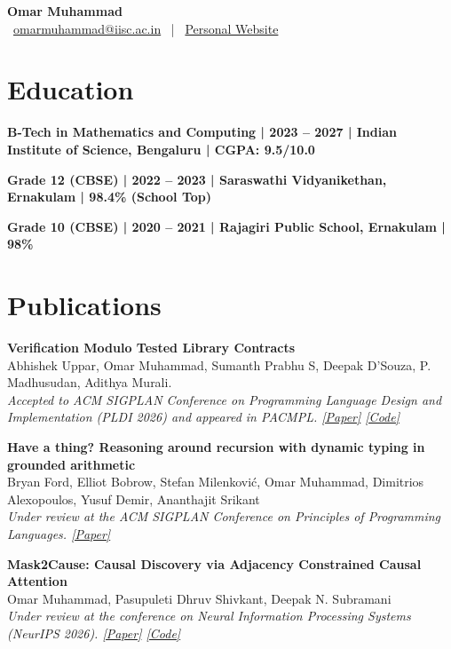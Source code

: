\documentclass[a4paper,10pt]{article}
\newcommand{\pub}[3]{
    \noindent \textbf{#1} \\
    #2 \\
    \textit{#3}
}
\begin{document}
\begin{center}
    {\Huge \textbf{\color{primary} Omar Muhammad}} \\ \vspace{4pt}
 \ \href{mailto:omarmuhammad@iisc.ac.in}{omarmuhammad@iisc.ac.in} \ | \ \href{https://omar826.github.io/}{Personal Website}
\end{center}


\section*{Education}
\noindent \textbf{B-Tech in Mathematics and Computing | 2023 -- 2027 | Indian Institute of Science, Bengaluru | CGPA: 9.5/10.0}

\vspace{3pt}
\noindent \textbf{Grade 12 (CBSE) | 2022 -- 2023 | Saraswathi Vidyanikethan, Ernakulam | 98.4\% (School Top)}

\vspace{3pt}
\noindent \textbf{Grade 10 (CBSE) | 2020 -- 2021 | Rajagiri Public School, Ernakulam | 98\%}

\section*{Publications}
\pub{Verification Modulo Tested Library Contracts}
{Abhishek Uppar, Omar Muhammad, Sumanth Prabhu S, Deepak D'Souza, P. Madhusudan, Adithya Murali.}
{Accepted to ACM SIGPLAN Conference on Programming Language Design and Implementation (PLDI 2026) and appeared in PACMPL. \href{https://dl.acm.org/doi/10.1145/3808305}{[Paper]} \href{https://github.com/omar826/Dualis-VMTLC}{[Code]}} 

\pub{Have a thing? Reasoning around recursion with dynamic typing in grounded arithmetic}
{Bryan Ford, Elliot Bobrow, Stefan Milenković, Omar Muhammad, Dimitrios Alexopoulos, Yusuf Demir, Ananthajit Srikant}
{Under review at the ACM SIGPLAN Conference on Principles of Programming Languages.
\href{https://arxiv.org/abs/2510.25369}{[Paper]}
}

\pub{Mask2Cause: Causal Discovery via Adjacency Constrained Causal Attention}
{Omar Muhammad, Pasupuleti Dhruv Shivkant, Deepak N. Subramani}
{Under review at the conference on Neural Information Processing Systems (NeurIPS 2026). \href{https://arxiv.org/abs/2605.07280}{[Paper]} \href{https://github.com/omar826/Mask2Cause}{[Code]}}
\end{document}
